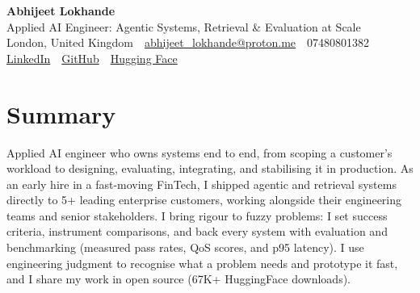 \documentclass[10pt,a4paper]{article}
\newcommand{\sep}{\,\textcolor{accent!60}{\textbar}\,}
\begin{document}
\begin{center}
  {\fontsize{24}{26}\selectfont\bfseries Abhijeet Lokhande}\\[3pt]
  {\color{accent}\large Applied AI Engineer: Agentic Systems, Retrieval \& Evaluation at Scale}\\[5pt]
  {\small
    London, United Kingdom \sep
    \href{mailto:abhijeet_lokhande@proton.me}{abhijeet\_lokhande@proton.me} \sep
    07480801382 \\[2pt]
    \href{https://www.linkedin.com/in/ablds/}{LinkedIn} \sep
    \href{https://github.com/abhijeetscode}{GitHub} \sep
    \href{https://huggingface.co/ab-ai}{Hugging Face}
  }
\end{center}
\vspace{2pt}

\section{Summary}
Applied AI engineer who owns systems end to end, from scoping a customer's workload to designing, evaluating, integrating, and stabilising it in production. As an early hire in a fast-moving FinTech, I shipped agentic and retrieval systems directly to 5+ leading enterprise customers, working alongside their engineering teams and senior stakeholders. I bring rigour to fuzzy problems: I set success criteria, instrument comparisons, and back every system with evaluation and benchmarking (measured pass rates, QoS scores, and p95 latency). I use engineering judgment to recognise what a problem needs and prototype it fast, and I share my work in open source (67K+ HuggingFace downloads).

\end{document}
